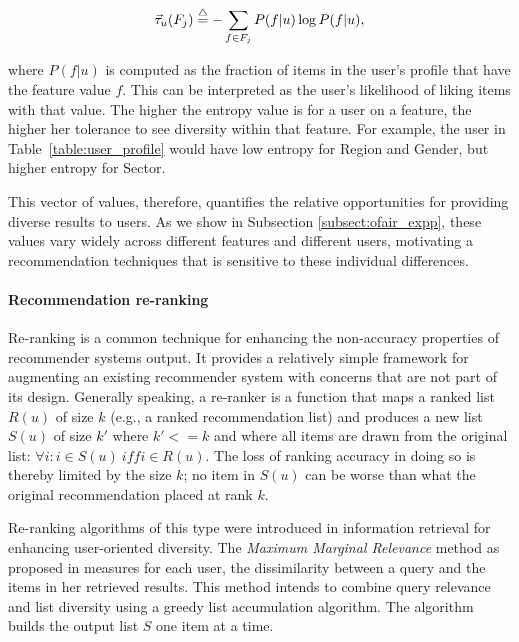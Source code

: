 \begin{equation}
\vec{\tau}_u(F_{j})\buildrel\triangle\over=-\sum_{f \in F_j} P(f|u)\log P(f|u),
\label{eq:tau}
\end{equation}

where $P(f|u)$ is computed as the fraction of items in the user's profile that have the feature value $f$. This can be interpreted as the user's likelihood of liking items with that value. The higher the entropy value is for a user on a feature, the higher her tolerance to see diversity within that feature. For example, the user in Table~\ref{table:user_profile} would have low entropy for Region and Gender, but higher entropy for Sector.

This vector of values, therefore, quantifies the relative opportunities for providing diverse results to users. As we show in Subsection \ref{subsect:ofair_expp}, these values vary widely across different features and different users, motivating a recommendation techniques that is sensitive to these individual differences. 

\noindent\paragraph{\textbf{Recommendation re-ranking}}
\newline
\indent Re-ranking is a common technique for enhancing the non-accuracy properties of recommender systems output. It provides a relatively simple framework for augmenting an existing recommender system with concerns that are not part of its design. Generally speaking, a re-ranker is a function that maps a ranked list $R(u)$ of size $k$ (e.g., a ranked recommendation list) and produces a new list $S(u)$ of size $k'$ where $k'<= k$ and where all items are drawn from the original list: $\forall{i}: i \in S(u) ~\mathit{iff} i\in R(u)$. The loss of ranking accuracy in doing so is thereby limited by the size $k$; no item in $S(u)$ can be worse than what the original recommendation placed at rank $k$. 

Re-ranking algorithms of this type were introduced in information retrieval for enhancing user-oriented diversity. The \textit{Maximum Marginal Relevance} method as proposed in \cite{carbonell1998use} measures for each user, the dissimilarity between a query and the items in her retrieved results. This method intends to combine query relevance and list diversity using a greedy list accumulation algorithm. The algorithm builds the output list $S$ one item at a time. 

